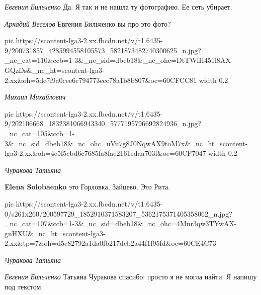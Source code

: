 \emph{Евгения Бильченко}
Да. Я так и не нашла ту фотографию. Ее сеть убирает.

\emph{Аркадий Веселов}
Евгения Бильченко вы про это фото?

\ifcmt
  pic https://scontent-lga3-2.xx.fbcdn.net/v/t1.6435-9/200731857_4285994558105573_5821873482740300625_n.jpg?_nc_cat=110&ccb=1-3&_nc_sid=dbeb18&_nc_ohc=DtTWlH451l8AX-GQzDs&_nc_ht=scontent-lga3-2.xx&oh=5de7f9a0cee6c794773eee78a1b8b807&oe=60CFCC81
  width 0.2
\fi

\emph{Михаил Михайлович}

\ifcmt
  pic https://scontent-lga3-2.xx.fbcdn.net/v/t1.6435-9/202106668_1832381066943340_5777195796692824936_n.jpg?_nc_cat=105&ccb=1-3&_nc_sid=dbeb18&_nc_ohc=uVu7g8J0NqwAX9toM7x&_nc_ht=scontent-lga3-2.xx&oh=4e5f5cbd6c7685fa8fae2161edaa703f&oe=60CF7047
  width 0.2
\fi

\emph{Чуракова Татьяна}

\textbf{Elena Solobaenko} это Горловка, Зайцево. Это Рита.

\ifcmt
  pic https://scontent-lga3-2.xx.fbcdn.net/v/t1.6435-0/s261x260/200597729_1852910371583207_5362175371405358062_n.jpg?_nc_cat=107&ccb=1-3&_nc_sid=dbeb18&_nc_ohc=4Mnr3qw3TYwAX-gnHXU&_nc_ht=scontent-lga3-2.xx&tp=7&oh=d5c82792a1da0fb217dcb2a44f1f95fd&oe=60CE4C73
\fi

\emph{Чуракова Татьяна}

\emph{Евгения Бильченко}
Татьяна Чуракова спасибо: просто я не могла найти. Я напишу под текстом.
